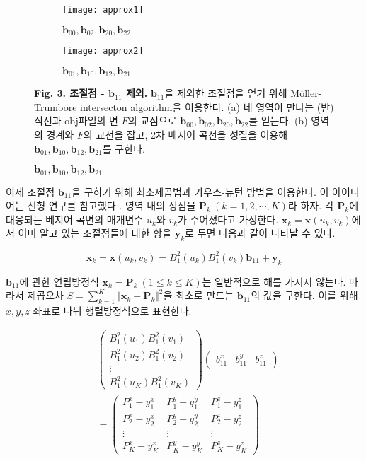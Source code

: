 \documentclass{Humantech_Paper_Awardfullpaper_hutech}
\begin{document}
\begin{figure}[h]
	\begin{center}
		\begin{subfigure}{.2\textwidth}
			\texttt{[image: approx1]}
			\caption{$\mathbf{b}_{00}, \mathbf{b}_{02}, \mathbf{b}_{20}, \mathbf{b}_{22}$}
		\end{subfigure}
		\begin{subfigure}{.2\textwidth}
			\texttt{[image: approx2]}
			\caption{$\mathbf{b}_{01}, \mathbf{b}_{10}, \mathbf{b}_{12}, \mathbf{b}_{21}$}
		\end{subfigure}
	\end{center} 
	\raggedright \small \textbf{Fig. 3. 조절점 - $\mathbf{b}_{11}$ 제외.} $\mathbf{b}_{11}$을 제외한 조절점을 얻기 위해 Möller-Trumbore intersecton algorithm을 이용한다. (a) 네 영역이 만나는 (반)직선과 obj파일의 면 $F$의 교점으로 $\mathbf{b}_{00}, \mathbf{b}_{02}, \mathbf{b}_{20}, \mathbf{b}_{22}$를 얻는다. (b) 영역의 경계와 $F$의 교선을 잡고, 2차 베지어 곡선을 성질을 이용해 $\mathbf{b}_{01}, \mathbf{b}_{10}, \mathbf{b}_{12}, \mathbf{b}_{21}$를 구한다. 
\end{figure}

이제 조절점 $\mathbf{b}_{11}$을 구하기 위해 최소제곱법과 가우스-뉴턴 방법을 이용한다. 이 아이디어는 선형 연구를 참고했다 \cite{2021}. 영역 내의 정점을 $\mathbf{P}_k \ (k=1, 2, \cdots, K)$라 하자. 각 $\mathbf{P}_k$에 대응되는 베지어 곡면의 매개변수 $u_k$와 $v_k$가 주어졌다고 가정한다. $\mathbf{x}_k = \mathbf{x}(u_k, v_k)$에서 이미 알고 있는 조절점들에 대한 항을 $\mathbf{y}_k$로 두면 다음과 같이 나타날 수 있다.

$$ \mathbf{x}_k = \mathbf{x}(u_k, v_k) = B_1^2(u_k) B_1^2(v_k) \mathbf{b}_{11} + \mathbf{y}_k $$ 

$\mathbf{b}_{11}$에 관한 연립방정식 $\mathbf{x}_k = \mathbf{P}_k \ (1 \leq k \leq K)$는 일반적으로 해를 가지지 않는다. 따라서 제곱오차 $S = \sum_{k=1}^K \Vert \mathbf{x}_k - \mathbf{P}_k \Vert^2$을 최소로 만드는 $\mathbf{b}_{11}$의 값을 구한다. 이를 위해 $x, y, z$ 좌표로 나눠 행렬방정식으로 표현한다. 

\begin{align*}
	&\begin{pmatrix}
		B_1^2(u_1)B_1^2(v_1) \\ B_1^2(u_2)B_1^2(v_2) \\ \vdots \\ B_1^2(u_K)B_1^2(v_K)
	\end{pmatrix} \begin{pmatrix}
		b_{11}^x & b_{11}^y & b_{11}^z
	\end{pmatrix} \\
	&= \begin{pmatrix}
		P_1^x-y_1^x & P_1^y-y_1^y & P_1^z-y_1^z \\ P_2^x-y_2^x & P_2^y-y_2^y & P_2^z-y_2^z \\ \vdots & \vdots & \vdots \\ P_K^x-y_K^x & P_K^y-y_K^y & P_K^z-y_K^z
	\end{pmatrix}
\end{align*}
\end{document}
